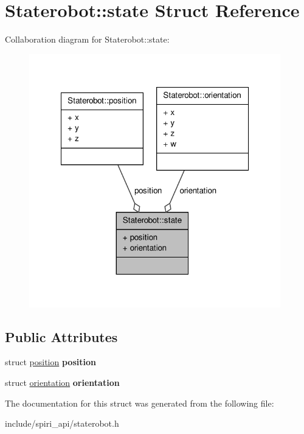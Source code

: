 \hypertarget{struct_staterobot_1_1state}{\section{\-Staterobot\-:\-:state \-Struct \-Reference}
\label{struct_staterobot_1_1state}
}


\-Collaboration diagram for \-Staterobot\-:\-:state\-:\nopagebreak
\begin{figure}[H]
\begin{center}
\leavevmode
\includegraphics[width=310pt]{struct_staterobot_1_1state__coll__graph}
\end{center}
\end{figure}
\subsection*{\-Public \-Attributes}
\begin{DoxyCompactItemize}
\item 
\hypertarget{struct_staterobot_1_1state_a1b3ab38c820d2a1c70c15d7a52e8e651}{struct \hyperlink{struct_staterobot_1_1position}{position} {\bfseries position}}\label{struct_staterobot_1_1state_a1b3ab38c820d2a1c70c15d7a52e8e651}

\item 
\hypertarget{struct_staterobot_1_1state_a8fee75dc89f771461844a6d39641d163}{struct \hyperlink{struct_staterobot_1_1orientation}{orientation} {\bfseries orientation}}\label{struct_staterobot_1_1state_a8fee75dc89f771461844a6d39641d163}

\end{DoxyCompactItemize}


\-The documentation for this struct was generated from the following file\-:\begin{DoxyCompactItemize}
\item 
include/spiri\-\_\-api/staterobot.\-h\end{DoxyCompactItemize}
